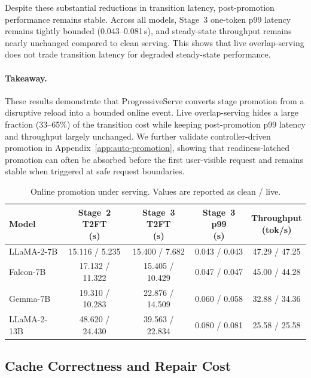 \documentclass[sigplan,anonymous,review,nonacm]{acmart}
\begin{document}
Despite these substantial reductions in transition latency, post-promotion performance remains stable. Across all models, Stage~3 one-token p99 latency remains tightly bounded (0.043--0.081\,s), and steady-state throughput remains nearly unchanged compared to clean serving. This shows that live overlap-serving does not trade transition latency for degraded steady-state performance.

\paragraph{Takeaway.}
These results demonstrate that ProgressiveServe converts stage promotion from a disruptive reload into a bounded online event. Live overlap-serving hides a large fraction (33--65\%) of the transition cost while keeping post-promotion p99 latency and throughput largely unchanged.
We further validate controller-driven promotion in Appendix~\ref{app:auto-promotion}, showing that readiness-latched promotion can often be absorbed before the first user-visible request and remains stable when triggered at safe request boundaries.




\begin{table}[t]
\centering
\caption{Online promotion under serving. Values are reported as clean / live.}
\label{tab:online-promotion}
\small
\setlength{\tabcolsep}{4pt}
\begin{tabular}{lcccc}
\toprule
Model 
& \makecell{Stage~2 T2FT\\(s)} 
& \makecell{Stage~3 T2FT\\(s)} 
& \makecell{Stage~3 p99\\(s)} 
& \makecell{Throughput\\(tok/s)} \\
\midrule
LLaMA-2-7B  & 15.116 / 5.235 & 15.400 / 7.682 & 0.043 / 0.043 & 47.29 / 47.25 \\
Falcon-7B   & 17.132 / 11.322 & 15.405 / 10.429 & 0.047 / 0.047 & 45.00 / 44.28 \\
Gemma-7B    & 19.310 / 10.283 & 22.876 / 14.509 & 0.060 / 0.058 & 32.88 / 34.36 \\
LLaMA-2-13B & 48.620 / 24.430 & 39.563 / 22.834 & 0.080 / 0.081 & 25.58 / 25.58 \\
\bottomrule
\end{tabular}
\end{table}


\subsection{Cache Correctness and Repair Cost}
\label{sec:eval-kv}
\end{document}
